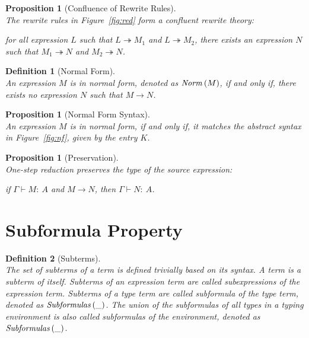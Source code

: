 \documentclass[a4paper]{article}
\newcommand{\typecolor}{}
\newcommand{\termcolor}{}
\newcommand{\tp}[1]{{\typecolor #1}}
\newcommand{\tm}[1]{{\termcolor #1}}
\newtheorem{proposition}[theorem]{Proposition}
\newtheorem{definition}{Definition}
\newcommand{\env}{\tp{\Gamma}}
\newcommand{\typing}[2]{\tm{#1:\ }\tp{#2}}
\newcommand{\txt}[1]{\text{\textit{#1}}}
\newcommand{\reduce}[3]{#1 \overset{#2}\rightarrow #3}
\newcommand{\reducestar}[3]{#1 \overset{#2}\twoheadrightarrow #3}
\newcommand{\subformulas}[1]{\txt{Subformulas}\,(#1)}
\newcommand{\norm}[1]{\txt{Norm}\,(#1)}
\begin{document}
\begin{proposition}[Confluence of Rewrite Rules]\ \\
\label{prop_confluency}
The rewrite rules in Figure~\ref{fig:red} form a confluent rewrite
theory:

for all expression $L$ such that $\reducestar{L}{}{M_1}$ and
$\reducestar{L}{}{M_2}$, there exists an expression $N$ such that
$\reducestar{M_1}{}{N}$ and $\reducestar{M_2}{}{N}$.

\end{proposition}
 
\begin{definition}[Normal Form]\ \\
An expression $M$ is in normal form, denoted as $\norm{M}$, if and only
if, there exists no expression $N$ such that $\reduce{M}{}{N}$.
\end{definition}

\begin{proposition}[Normal Form Syntax]\ \\
\label{prop_normal}
An expression $M$ is in normal form, if and only if, it matches the
abstract syntax in Figure~\ref{fig:nf}, given by the entry $K$.
\end{proposition}
 

\begin{proposition}[Preservation]\ \\
\label{prop_preservation}
One-step reduction preserves the type of the source expression:
 
 if $\env \vdash \typing{M}{A}$ and $\reduce{M}{}{N}$, then 
$\env \vdash \typing{N}{A}$.
\end{proposition}

\section{Subformula Property}

\begin{definition}[Subterms]\ \\
The set of subterms of a term is defined trivially based on its
syntax. A term is a subterm of itself. Subterms of an expression term
are called subexpressions of the expression term. Subterms of a type
term are called subformula of the type term, denoted as
$\subformulas{\_}$. The union of the subformulas of all types in a typing
environment is also called subformulas of the environment, denoted as
$\subformulas{\_}$.
\end{definition}
 
\end{document}

